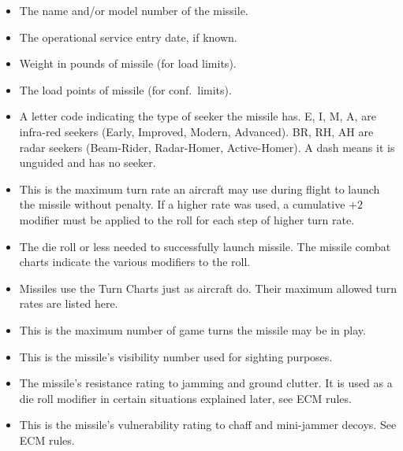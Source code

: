 \begin{itemize}

    \item {} The name and/or model number of the missile.

    \item {} The operational service entry date, if known.

    \item {} Weight in pounds of missile (for load limits).

    \item {} The load points of missile (for conf.\ limits).

    \item {} A letter code indicating the type of seeker the missile has. E, I, M, A, are infra-red seekers (Early, Improved, Modern, Advanced).  BR, RH, AH are radar seekers (Beam-Rider, Radar-Homer, Active-Homer). A dash means it is unguided and has no seeker.

    \item {} This is the maximum turn rate an aircraft may use during flight to launch the missile without penalty. If a higher rate was used, a cumulative $+2$ modifier must be applied to the roll for each step of higher turn rate.

    \item {} The die roll or less needed to successfully launch missile. The missile combat charts indicate the various modifiers to the roll.

    \item {} Missiles use the Turn Charts just as aircraft do. Their maximum allowed turn rates are listed here.

    \item {} This is the maximum number of game turns the missile may be in play.

    \item {} This is the missile's visibility number used for sighting purposes.

    \item {} The missile's resistance rating to jamming and ground clutter. It is used as a die roll modifier in certain situations explained later, see ECM rules.

    \item {} This is the missile's vulnerability rating to chaff and mini-jammer decoys. See ECM rules.


\end{itemize}
